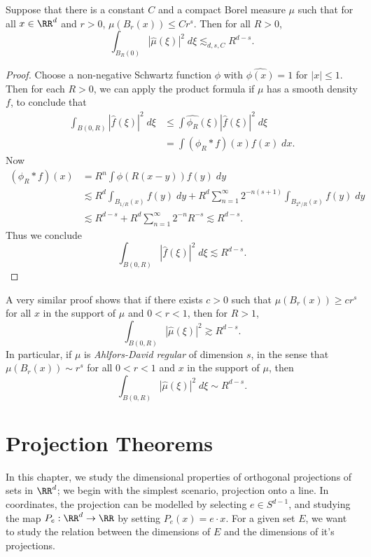 \begin{theorem}
	Suppose that there is a constant $C$ and a compact Borel measure $\mu$ such that for all $x \in \RR^d$ and $r > 0$, $\mu(B_r(x)) \leq C r^s$. Then for all $R > 0$,
	\[ \int_{B_R(0)} |\widehat{\mu}(\xi)|^2\; d\xi \lesssim_{d,s,C} R^{d-s}. \]
\end{theorem}
\begin{proof}
	Choose a non-negative Schwartz function $\phi$ with $\widehat{\phi(x)} = 1$ for $|x| \leq 1$. Then for each $R > 0$, we can apply the product formula if $\mu$ has a smooth density $f$, to conclude that
	\begin{align*}
		\int_{B(0,R)} |\widehat{f}(\xi)|^2\; d\xi &\leq \int \widehat{\phi_R}(\xi) |\widehat{f}(\xi)|^2\; d\xi\\
		&= \int (\phi_R * f)(x) f(x)\; dx.
	\end{align*}
	Now
	\begin{align*}
		(\phi_R * f)(x) &= R^n \int \phi(R(x-y)) f(y)\; dy\\
		&\lesssim R^d \int_{B_{1/R}(x)} f(y)\; dy + R^d \sum_{n = 1}^\infty 2^{-n(s + 1)} \int_{B_{2^n/R}(x)} f(y)\; dy\\
		&\lesssim R^{d-s} + R^d \sum_{n = 1}^\infty 2^{-n} R^{-s} \lesssim R^{d-s}.
	\end{align*}
	Thus we conclude
	\[ \int_{B(0,R)} |\widehat{f}(\xi)|^2\; d\xi \lesssim R^{d-s}. \]
\end{proof}

\begin{remark}
	A very similar proof shows that if there exists $c > 0$ such that $\mu(B_r(x)) \geq c r^s$ for all $x$ in the support of $\mu$ and $0 < r < 1$, then for $R > 1$,
	\[ \int_{B(0,R)} |\widehat{\mu}(\xi)|^2 \gtrsim R^{d-s}. \]
	In particular, if $\mu$ is \emph{Ahlfors-David regular} of dimension $s$, in the sense that $\mu(B_r(x)) \sim r^s$ for all $0 < r < 1$ and $x$ in the support of $\mu$, then
	\[ \int_{B(0,R)} |\widehat{\mu}(\xi)|^2\; d\xi \sim R^{d-s}. \]
\end{remark}

\chapter{Projection Theorems}

In this chapter, we study the dimensional properties of orthogonal projections of sets in $\RR^d$; we begin with the simplest scenario, projection onto a line. In coordinates, the projection can be modelled by selecting $e \in S^{d-1}$, and studying the map $P_e: \RR^d \to \RR$ by setting $P_e(x) = e \cdot x$. For a given set $E$, we want to study the relation between the dimensions of $E$ and the dimensions of it's projections.

